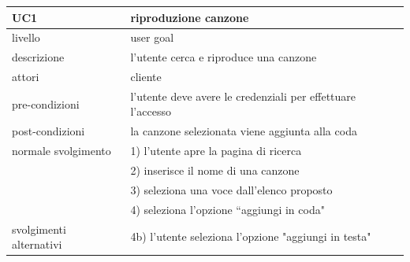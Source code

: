 \documentclass{article}
\begin{document}
  \begin{center}
    \begin{tabular}{|l|l|}
      \hline
      \textbf{UC1}            & \textbf{riproduzione canzone}                               \\
      \hline
      livello                 & user goal                                                   \\
      \hline
      descrizione             & l'utente cerca e riproduce una canzone                      \\
      \hline
      attori                  & cliente                                                     \\
      \hline
      pre-condizioni          & l'utente deve avere le credenziali per effettuare l'accesso \\
      \hline
      post-condizioni         & la canzone selezionata viene aggiunta alla coda             \\
      \hline
      normale svolgimento     & 1) l'utente apre la pagina di ricerca                       \\
      & 2) inserisce il nome di una canzone                         \\
      & 3) seleziona una voce dall'elenco proposto                  \\
      & 4) seleziona l'opzione ``aggiungi in coda"

      \\
      \hline
      svolgimenti alternativi & 4b) l'utente seleziona l'opzione "aggiungi in testa"        \\
      \hline

    \end{tabular}

    \vspace{40pt}


\end{center}
\end{document}

